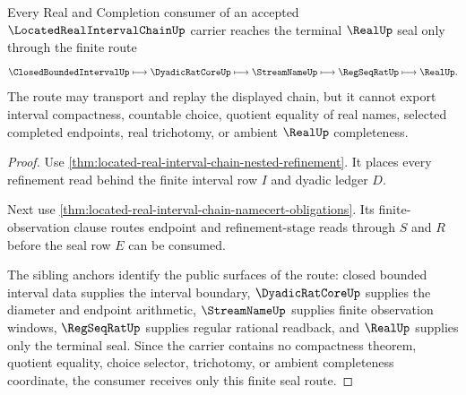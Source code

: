 \begin{theorem}
\label{thm:located-real-interval-chain-real-seal-route}
Every Real and Completion consumer of an accepted $\LocatedRealIntervalChainUp$ carrier reaches the terminal $\RealUp$ seal only through the finite route
$$
\ClosedBoundedIntervalUp \longmapsto \DyadicRatCoreUp \longmapsto \StreamNameUp \longmapsto \RegSeqRatUp \longmapsto \RealUp .
$$
The route may transport and replay the displayed chain, but it cannot export interval compactness, countable choice, quotient equality of real names, selected completed endpoints, real trichotomy, or ambient $\RealUp$ completeness.
\end{theorem}
\begin{proof}
Use \autoref{thm:located-real-interval-chain-nested-refinement}. It places every refinement read behind the finite interval row $I$ and dyadic ledger $D$.

Next use \autoref{thm:located-real-interval-chain-namecert-obligations}. Its finite-observation clause routes endpoint and refinement-stage reads through $S$ and $R$ before the seal row $E$ can be consumed.

The sibling anchors identify the public surfaces of the route: closed bounded interval data supplies the interval boundary, $\DyadicRatCoreUp$ supplies the diameter and endpoint arithmetic, $\StreamNameUp$ supplies finite observation windows, $\RegSeqRatUp$ supplies regular rational readback, and $\RealUp$ supplies only the terminal seal. Since the carrier contains no compactness theorem, quotient equality, choice selector, trichotomy, or ambient completeness coordinate, the consumer receives only this finite seal route.
\end{proof}


\begin{closurestatus}{\LocatedRealIntervalChainUp}
  \theoryclosure{\seedClosure}
  \formalstatus{\unformalizedV}
\end{closurestatus}
